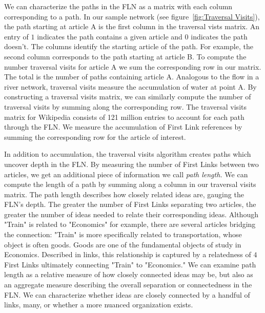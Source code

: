 \documentclass[pre,twocolumn,twoside,superscriptaddress,floatfix, aps, 10pt]{revtex4-1}
\begin{document}
We can characterize the paths in the FLN as a matrix with each column corresponding to a path. In our sample network 
(see figure~\ref{fig:Traversal Visits}), the path starting at article A is the 
first column in the traversal vists matrix. 
An entry of $1$ indicates the path contains a given article and 
$0$ indicates the path doesn't. The columns identify the starting article of the path. 
For example, the second column corresponds to the path starting at article B. 
To compute the number traversal visits for article A we sum the corresponding row in our matrix.
The total is the number of paths containing article A. 
Analogous to the flow 
in a river network, traversal visits measure the accumulation of water at point A. 
By constructing a traversal visits matrix, we can similarly compute the number of traversal 
visits by summing along the corresponding row. The traversal visits matrix for 
Wikipedia consists of 121 million entries to account for each path through the FLN. 
We measure the accumulation of First Link references by summing the corresponding row for the 
article of interest.


In addition to accumulation, the traversal visits algorithm creates paths 
which uncover depth in the FLN. 
By measuring the number of First Links between
two articles, we get an additional piece of information we call 
{\it path length.} We can compute the length of a path by summing 
along a column in our traversal visits matrix. 
The path length describes how closely related ideas are, gauging the FLN's depth.
The greater the number of First Links separating two articles, the greater the number of ideas needed to relate their corresponding ideas. Although
"Train" is related to "Economics" for example, there are several articles
bridging the connection:
"Train" is more specifically related to transportation, whose object
is often goods. Goods are one of the fundamental objects of study in Economics.
Described in links, this relationship is captured by a relatedness of $4$ 
First Links ultimately connecting "Train" to "Economics." 
We can examine path length as a relative measure of how closely connected ideas
may be, but also as an aggregate measure describing the overall separation or 
connectedness in the FLN.
We can characterize whether ideas are closely connected by a handful of links, 
many, or whether a more nuanced organization exists. 
\end{document}
